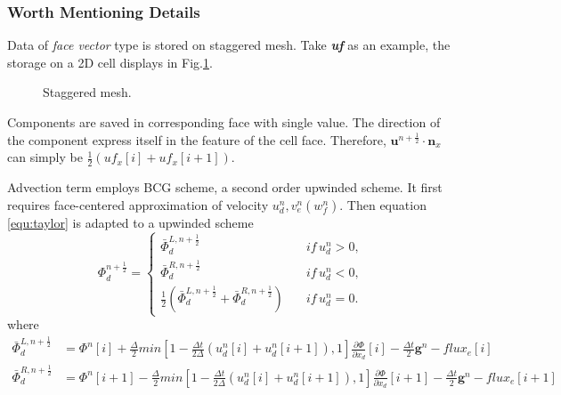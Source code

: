 \documentclass[a4paper]{article}
\newcommand{\para}[1]{\textbf{\emph{\textcolor{para}{#1}}}}
\begin{document}
\subsubsection{Worth Mentioning Details}\label{sec:tracerdetail}
Data of \emph{face vector} type is stored on staggered mesh\cite{harlow1965numerical}. Take \para{uf} as an example, the storage on a 2D cell displays in Fig.\ref{fig:staggered}.
\begin{figure}[H]
     \centering
     \begin{center}
     \end{center}
     \caption{Staggered mesh.}
     \label{fig:staggered}
\end{figure}
Components are saved in corresponding face with single value. The direction of the component express itself in the feature of the cell face. Therefore, $ \mathbf{u}^{n + \frac{1}{2}} \cdot \mathbf{n}_x$ can simply be $ \frac{1}{2}(uf_x[i]+uf_x[i+1])$.\par
Advection term employs BCG scheme\cite{martin2000cell}, a second order upwinded scheme. It first requires face-centered approximation of velocity $u_d^n,v_e^n(w_f^n)$. Then equation \ref{equ:taylor} is adapted to a upwinded scheme
\begin{equation}
  \Phi_d^{n+ \frac{1}{2}}=
    \left \{ 
    \begin{array}{cc}
      \bar{\Phi}^{L,n+ \frac{1}{2}}_d\quad &if\, u_d^n>0,\\
      \bar{\Phi}^{R,n+ \frac{1}{2}}_d\quad &if\, u_d^n<0,\\
      \frac{1}{2}(\bar{\Phi}^{L,n+ \frac{1}{2}}_d+\bar{\Phi}^{R,n+ \frac{1}{2}}_d)\quad &if \,u_d^n=0.
    \end{array}
    \right.
\end{equation}
where
\begin{align}
  \bar{\Phi}^{L,n+ \frac{1}{2}}_d &= \Phi^n[i] + \frac{\Delta}{2}min[1- \frac{\Delta t}{2\Delta}(u_d^n[i]+u_d^n[i+1]),1] \frac{\partial \Phi}{\partial x_d}[i]- \frac{\Delta t}{2} \mathbf{g}^n-flux_e[i]\\
  \bar{\Phi}^{R,n+ \frac{1}{2}}_d &= \Phi^n[i+1] - \frac{\Delta}{2}min[1- \frac{\Delta t}{2\Delta}(u_d^n[i]+u_d^n[i+1]),1]\frac{\partial \Phi}{\partial x_d}[i+1]- \frac{\Delta t}{2} \mathbf{g}^n-flux_e[i+1]
\end{align}
\end{document}
